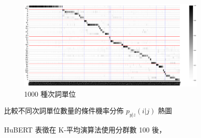 {{{\begin{figure}
             \vfill
             \begin{subfigure}{\textwidth}
                 \centering
                 \includegraphics[width=\tempwidth]{feasiblefigs/ch4figs/hub-u100-ap1000-givenunit-byphn.png}
                 \caption{1000 種次詞單位}
                 \label{fig:hub-u100-ap1000-givenunit-byphn}
             \end{subfigure}

             \caption{HuBERT 表徵在 K-平均演算法使用分群數 100 後，}
             比較不同次詞單位數量的條件機率分佈 $p_{y|z}(i | j)$ 熱圖
             \label{fig:hub-u100-comparisons}
        \end{figure}
    }
}

}
